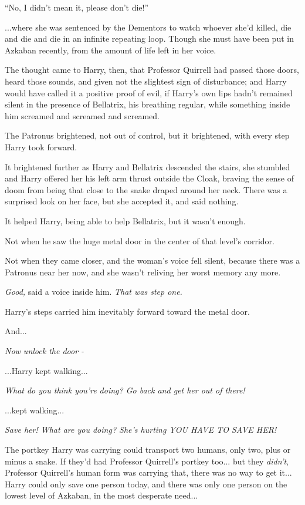 ``No, I didn't mean it, please don't die!''

...where she was sentenced by the Dementors to watch whoever she'd
killed, die and die and die in an infinite repeating loop. Though she
must have been put in Azkaban recently, from the amount of life left in
her voice.

The thought came to Harry, then, that Professor Quirrell had passed
those doors, heard those sounds, and given not the slightest sign of
disturbance; and Harry would have called it a positive proof of evil, if
Harry's own lips hadn't remained silent in the presence of Bellatrix,
his breathing regular, while something inside him screamed and screamed
and screamed.

The Patronus brightened, not out of control, but it brightened, with
every step Harry took forward.

It brightened further as Harry and Bellatrix descended the stairs, she
stumbled and Harry offered her his left arm thrust outside the Cloak,
braving the sense of doom from being that close to the snake draped
around her neck. There was a surprised look on her face, but she
accepted it, and said nothing.

It helped Harry, being able to help Bellatrix, but it wasn't enough.

Not when he saw the huge metal door in the center of that level's
corridor.

Not when they came closer, and the woman's voice fell silent, because
there was a Patronus near her now, and she wasn't reliving her worst
memory any more.

\emph{Good,} said a voice inside him. \emph{That was step one.}

Harry's steps carried him inevitably forward toward the metal door.

And...

\emph{Now unlock the door -}

...Harry kept walking...

\emph{What do you think you're doing? Go back and get her out of there!}

...kept walking...

\emph{Save her! What are you doing? She's hurting YOU HAVE TO SAVE HER!}

The portkey Harry was carrying could transport two humans, only two,
plus or minus a snake. If they'd had Professor Quirrell's portkey
too... but they \emph{didn't}, Professor Quirrell's human form was
carrying that, there was no way to get it... Harry could only save
one person today, and there was only one person on the lowest level of
Azkaban, in the most desperate need...

